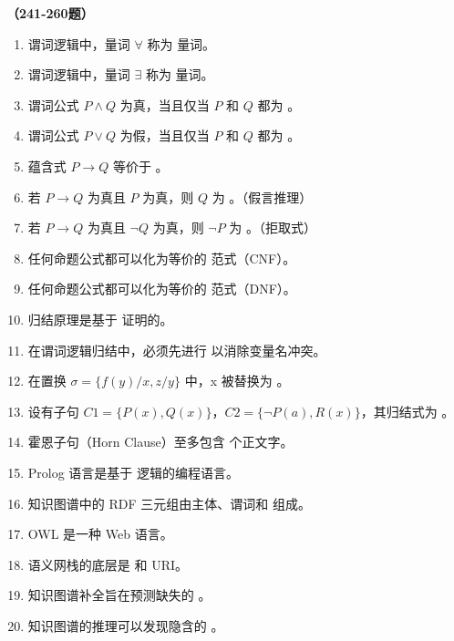 \vspace{1em}
\textbf{（241-260题）}
\begin{enumerate}[resume,leftmargin=2em,itemsep=1pt]
\item 谓词逻辑中，量词 $\forall$ 称为 \underline{\hspace{3em}} 量词。
\item 谓词逻辑中，量词 $\exists$ 称为 \underline{\hspace{3em}} 量词。
\item 谓词公式 $P \land Q$ 为真，当且仅当 $P$ 和 $Q$ 都为 \underline{\hspace{3em}}。
\item 谓词公式 $P \lor Q$ 为假，当且仅当 $P$ 和 $Q$ 都为 \underline{\hspace{3em}}。
\item 蕴含式 $P \to Q$ 等价于 \underline{\hspace{3em}}。
\item 若 $P \to Q$ 为真且 $P$ 为真，则 $Q$ 为 \underline{\hspace{3em}}。（假言推理）
\item 若 $P \to Q$ 为真且 $\neg Q$ 为真，则 $\neg P$ 为 \underline{\hspace{3em}}。（拒取式）
\item 任何命题公式都可以化为等价的 \underline{\hspace{3em}} 范式（CNF）。
\item 任何命题公式都可以化为等价的 \underline{\hspace{3em}} 范式（DNF）。
\item 归结原理是基于 \underline{\hspace{3em}} 证明的。
\item 在谓词逻辑归结中，必须先进行 \underline{\hspace{3em}} 以消除变量名冲突。
\item 在置换 $\sigma = \{f(y)/x, z/y\}$ 中，x 被替换为 \underline{\hspace{3em}}。
\item 设有子句 $C1=\{P(x), Q(x)\}$，$C2=\{\neg P(a), R(x)\}$，其归结式为 \underline{\hspace{3em}}。
\item 霍恩子句（Horn Clause）至多包含 \underline{\hspace{3em}} 个正文字。
\item Prolog 语言是基于 \underline{\hspace{3em}} 逻辑的编程语言。
\item 知识图谱中的 RDF 三元组由主体、谓词和 \underline{\hspace{3em}} 组成。
\item OWL 是一种 Web \underline{\hspace{3em}} 语言。
\item 语义网栈的底层是 \underline{\hspace{3em}} 和 URI。
\item 知识图谱补全旨在预测缺失的 \underline{\hspace{3em}}。
\item 知识图谱的推理可以发现隐含的 \underline{\hspace{3em}}。
\end{enumerate}


